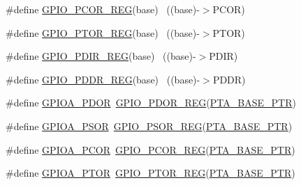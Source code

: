 \begin{DoxyCompactItemize}
\item 
\#define \hyperlink{group___g_p_i_o___register___accessor___macros_gafeabd0beb942930229271934efc513ef}{G\+P\+I\+O\+\_\+\+P\+C\+O\+R\+\_\+\+R\+EG}(base)                                        ~((base)-\/$>$P\+C\+OR)
\item 
\#define \hyperlink{group___g_p_i_o___register___accessor___macros_ga4c1b943d4d92f73c9f08d272d8fc8fe1}{G\+P\+I\+O\+\_\+\+P\+T\+O\+R\+\_\+\+R\+EG}(base)                                        ~((base)-\/$>$P\+T\+OR)
\item 
\#define \hyperlink{group___g_p_i_o___register___accessor___macros_gac2c9f15f5083562b4f7c2826afe2d2b6}{G\+P\+I\+O\+\_\+\+P\+D\+I\+R\+\_\+\+R\+EG}(base)                                        ~((base)-\/$>$P\+D\+IR)
\item 
\#define \hyperlink{group___g_p_i_o___register___accessor___macros_ga059c8153363c15c02fbf13c0de04298d}{G\+P\+I\+O\+\_\+\+P\+D\+D\+R\+\_\+\+R\+EG}(base)                                        ~((base)-\/$>$P\+D\+DR)
\item 
\#define \hyperlink{group___g_p_i_o___register___accessor___macros_ga5c5a9a4e809579e68ae743d931312cc5}{G\+P\+I\+O\+A\+\_\+\+P\+D\+OR}~\hyperlink{group___g_p_i_o___register___accessor___macros_ga737b4580bb16c01a468bc2c129e54d86}{G\+P\+I\+O\+\_\+\+P\+D\+O\+R\+\_\+\+R\+EG}(\hyperlink{group___g_p_i_o___peripheral_gadf98f6ee2bbfd42102e378a66b29b9ef}{P\+T\+A\+\_\+\+B\+A\+S\+E\+\_\+\+P\+TR})
\item 
\#define \hyperlink{group___g_p_i_o___register___accessor___macros_gaa89816040d1c6678e816aa3e7a7eef07}{G\+P\+I\+O\+A\+\_\+\+P\+S\+OR}~\hyperlink{group___g_p_i_o___register___accessor___macros_ga05da33b22ee087558800c07d743c52e7}{G\+P\+I\+O\+\_\+\+P\+S\+O\+R\+\_\+\+R\+EG}(\hyperlink{group___g_p_i_o___peripheral_gadf98f6ee2bbfd42102e378a66b29b9ef}{P\+T\+A\+\_\+\+B\+A\+S\+E\+\_\+\+P\+TR})
\item 
\#define \hyperlink{group___g_p_i_o___register___accessor___macros_gae6b29d3effc6cd3f9b9a09fc163e93f1}{G\+P\+I\+O\+A\+\_\+\+P\+C\+OR}~\hyperlink{group___g_p_i_o___register___accessor___macros_gafeabd0beb942930229271934efc513ef}{G\+P\+I\+O\+\_\+\+P\+C\+O\+R\+\_\+\+R\+EG}(\hyperlink{group___g_p_i_o___peripheral_gadf98f6ee2bbfd42102e378a66b29b9ef}{P\+T\+A\+\_\+\+B\+A\+S\+E\+\_\+\+P\+TR})
\item 
\#define \hyperlink{group___g_p_i_o___register___accessor___macros_ga81578b02d0ebd91fae31edbf4bf355eb}{G\+P\+I\+O\+A\+\_\+\+P\+T\+OR}~\hyperlink{group___g_p_i_o___register___accessor___macros_ga4c1b943d4d92f73c9f08d272d8fc8fe1}{G\+P\+I\+O\+\_\+\+P\+T\+O\+R\+\_\+\+R\+EG}(\hyperlink{group___g_p_i_o___peripheral_gadf98f6ee2bbfd42102e378a66b29b9ef}{P\+T\+A\+\_\+\+B\+A\+S\+E\+\_\+\+P\+TR})

\end{DoxyCompactItemize}
